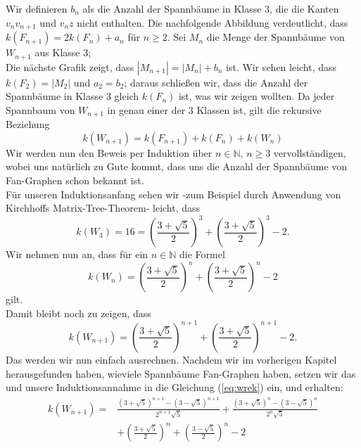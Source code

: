 Wir definieren $b_n$ als die Anzahl der Spannbäume in Klasse 3, die die Kanten $v_nv_{n+1}$ und $v_nz$ nicht enthalten. 
Die nachfolgende Abbildung verdeutlicht, dass $\mathit{k}(F_{n+1})=2\mathit{k}(F_{n})+a_n$ für $n\geq 2$.
Sei $M_n$ die Menge der Spannbäume von $W_{n+1}$ aus Klasse 3;\\
Die nächste Grafik zeigt, dass $|M_{n+1}|=|M_n|+b_n$ ist.
Wir sehen leicht, dass $\mathit{k}(F_2) = |M_2|$ und $a_2=b_2$; daraus schließen wir, dass die Anzahl der Spannbäume in Klasse 3 gleich $\mathit{k}(F_{n})$ ist, was wir zeigen wollten.
Da jeder Spannbaum von $W_{n+1}$ in genau einer der 3 Klassen ist, gilt die rekursive Beziehung
\begin{equation}
\mathit{k}(W_{n+1}) = \mathit{k}(F_{n+1}) + \mathit{k}(F_n) + \mathit{k}(W_n)
\label{eq:wrek}
\end{equation}
Wir werden nun den Beweis per Induktion über $n \in \mathbb{N}, \, n \geq 3$ vervollständigen, wobei uns natürlich zu Gute kommt, dass uns die Anzahl der Spannbäume von Fan-Graphen schon bekannt ist.\\
Für unseren Induktionsanfang sehen wir -zum Beispiel durch Anwendung von Kirchhoffs Matrix-Tree-Theorem- leicht, dass \begin{equation}
\mathit{k}(W_3) = 16 = (\frac{3+\sqrt{5}}{2})^3+(\frac{3+\sqrt{5}}{2})^3-2.
\end{equation}
Wir nehmen nun an, dass für ein $n \in \mathbb{N}$ die Formel 
\begin{equation}
 \mathit{k}(W_n) = (\frac{3+\sqrt{5}}{2})^n+(\frac{3+\sqrt{5}}{2})^n-2
\end{equation}
gilt.\\
Damit bleibt noch zu zeigen, dass
\begin{equation}
 \mathit{k}(W_{n+1}) = (\frac{3+\sqrt{5}}{2})^{n+1}+(\frac{3+\sqrt{5}}{2})^{n+1}-2.
\end{equation}
Das werden wir nun einfach ausrechnen.
Nachdem wir im vorherigen Kapitel herausgefunden haben, wieviele Spannbäume Fan-Graphen haben, setzen wir das und unsere Induktionsannahme in die Gleichung (\ref{eq:wrek}) ein, und erhalten:\\
\begin{equation}
\begin{aligned}
\mathit{k}(W_{n+1}) ={} & \frac{(3+\sqrt{5})^{n+1}-(3-\sqrt{5})^{n+1}}{2^{n+1}\sqrt{5}} + \frac{(3+\sqrt{5})^{n}-(3-\sqrt{5})^{n}}{2^{n}\sqrt{5}}\\
& + (\frac{3+\sqrt{5}}{2})^n+(\frac{3-\sqrt{5}}{2})^n-2
\end{aligned}
\end{equation}
